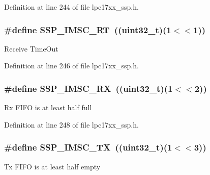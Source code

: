 \-Definition at line 244 of file lpc17xx\-\_\-ssp.\-h.

\hypertarget{group___s_s_p___private___macros_ga0396910287899ff6ab730425a8a332c7}{
\subsubsection[{\-S\-S\-P\-\_\-\-I\-M\-S\-C\-\_\-\-R\-T}]{\setlength{\rightskip}{0pt plus 5cm}\#define {\bf \-S\-S\-P\-\_\-\-I\-M\-S\-C\-\_\-\-R\-T}~((uint32\-\_\-t)(1$<$$<$1))}}\label{group___s_s_p___private___macros_ga0396910287899ff6ab730425a8a332c7}
\-Receive \-Time\-Out 

\-Definition at line 246 of file lpc17xx\-\_\-ssp.\-h.

\hypertarget{group___s_s_p___private___macros_ga9f4d1fa05f49655cc6e5548b11dfe092}{
\subsubsection[{\-S\-S\-P\-\_\-\-I\-M\-S\-C\-\_\-\-R\-X}]{\setlength{\rightskip}{0pt plus 5cm}\#define {\bf \-S\-S\-P\-\_\-\-I\-M\-S\-C\-\_\-\-R\-X}~((uint32\-\_\-t)(1$<$$<$2))}}\label{group___s_s_p___private___macros_ga9f4d1fa05f49655cc6e5548b11dfe092}
\-Rx \-F\-I\-F\-O is at least half full 

\-Definition at line 248 of file lpc17xx\-\_\-ssp.\-h.

\hypertarget{group___s_s_p___private___macros_ga0e1c817c6d276a0fd17b0c4d21668818}{
\subsubsection[{\-S\-S\-P\-\_\-\-I\-M\-S\-C\-\_\-\-T\-X}]{\setlength{\rightskip}{0pt plus 5cm}\#define {\bf \-S\-S\-P\-\_\-\-I\-M\-S\-C\-\_\-\-T\-X}~((uint32\-\_\-t)(1$<$$<$3))}}\label{group___s_s_p___private___macros_ga0e1c817c6d276a0fd17b0c4d21668818}
\-Tx \-F\-I\-F\-O is at least half empty 


